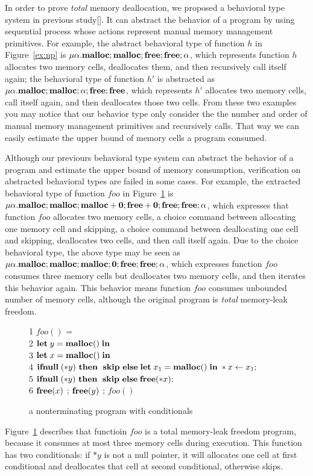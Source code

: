 In order to prove \emph{total} memory deallocation, we proposed a
behavioral type system in previous study[]. It can abstract the
behavior of a program by using sequential process whose actions
represent manual memory management primitives. For example, the
abstract behavioral type of function \(h\) in Figure~\ref{ex:np} is
\(\mu\alpha.\mathbf{malloc};\mathbf{malloc};\mathbf{free};\mathbf{free};\alpha\), which represents
function \(h\) allocates two memory cells, deallocates them, and then
recursively call itself again; the behavioral type of function \(h'\)
is abstracted as \(\mu\alpha.\mathbf{malloc};\mathbf{malloc};\alpha;\mathbf{free};\mathbf{free}\),
which represents \(h'\) allocates two memory cells, call itself again,
and then deallocates those two cells. From these two examples you may
notice that our behavior type only consider the the number and order
of manual memory management primitives and recursively calls. That way
we can easily estimate the upper bound of memory cells a program
consumed.

Although our previours behavioral type system can abstract the
behavior of a program and estimate the upper bound of memory
consumption, verification on abstracted behavioral types are failed in
some cases. For example, the extracted behavioral type of function
\(foo\) in Figure~\ref{ex:np2} is \( \mu\alpha.\mathbf{malloc};\mathbf{malloc};\mathbf{malloc}
+ \mathbf{0};\mathbf{free} + \mathbf{0};\mathbf{free};\mathbf{free};\alpha \), which expresses that
function \(foo\) allocates two memory cells, a choice command between
allocating one memory cell and skipping, a choice command between
deallocating one cell and skipping, deallocates two cells, and then
call itself again. Due to the choice behavioral type, the above type
may be seen as \(
\mu\alpha.\mathbf{malloc};\mathbf{malloc};\mathbf{malloc};\mathbf{0};\mathbf{free};\mathbf{free};\alpha \), which
expresses function \(foo\) consumes three memory cells but deallocates
two memory cells, and then iterates this behavior again. This behavior
means function \(foo\) consumes unbounded number of memory cells,
although the original program is \emph{total} memory-leak freedom.

\begin{exmp}\label{ex:ex2}
\begin{figure}[h]
1  \dtb $foo()$ =  \\
2    \dtb \dtb  $\mathbf{let}\; y = \mathbf{malloc()}\; \mathbf{in}\; $ \\
3    \dtb \dtb  $\mathbf{let}\; x = \mathbf{malloc()}\; \mathbf{in}\; $\\
4    \dtb \dtb  $\mathbf{ifnull}\;(*y) \ \mathbf{then}\; \ \mathbf{skip} \ \mathbf{else}\; \mathbf{let}\; x_1 = \mathbf{malloc()}\; \mathbf{in}\;  *x \leftarrow x_1  ;$ \\
5   \dtb \dtb   $\mathbf{ifnull}\;(*y) \ \mathbf{then}\; \ \mathbf{skip} \ \mathbf{else}\; \mathbf{free}(*x) ;$ \\
6   \dtb \dtb   $\mathbf{free}(x)$ ; $\mathbf{free}(y)$ ; $foo()$
\caption{a nonterminating program with conditionals}
\label{ex:np2}
\end{figure}
Figure~\ref{ex:np2} describes that functioin \(foo\) is a total
memory-leak freedom program, because it consumes at most three memory
cells during execution. This function has two conditionals: if \(*y\)
is not a null pointer, it will allocates one cell at first conditional
and deallocates that cell at second conditional, otherwise skips.
\end{exmp}

